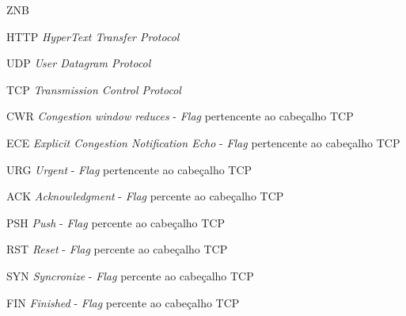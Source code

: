 
\begin{siglas}
	\item[ZNB]
    \item[HTTP] \textit{HyperText Transfer Protocol}
    \item[UDP] \textit{User Datagram Protocol}
	\item[TCP] \textit{Transmission Control Protocol}
	\item [CWR] \textit{Congestion window reduces} - \textit{Flag} pertencente ao cabeçalho TCP
	\item [ECE] \textit{Explicit Congestion Notification Echo} - \textit{Flag} pertencente ao cabeçalho TCP
	\item [URG] \textit{Urgent} - \textit{Flag} pertencente ao cabeçalho TCP
	\item [ACK] \textit{Acknowledgment} - \textit{Flag} percente ao cabeçalho TCP
	\item [PSH] \textit{Push} - \textit{Flag} percente ao cabeçalho TCP
	\item [RST] \textit{Reset} - \textit{Flag} percente ao cabeçalho TCP
	\item [SYN] \textit{Syncronize} - \textit{Flag} percente ao cabeçalho TCP
	\item [FIN] \textit{Finished} - \textit{Flag} percente ao cabeçalho TCP
\end{siglas}

